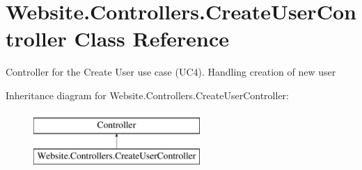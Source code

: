 \hypertarget{class_website_1_1_controllers_1_1_create_user_controller}{}\section{Website.\+Controllers.\+Create\+User\+Controller Class Reference}
\label{class_website_1_1_controllers_1_1_create_user_controller}


Controller for the Create User use case (U\+C4). Handling creation of new user  


Inheritance diagram for Website.\+Controllers.\+Create\+User\+Controller\+:\begin{figure}[H]
\begin{center}
\leavevmode
\includegraphics[height=2.000000cm]{class_website_1_1_controllers_1_1_create_user_controller}
\end{center}
\end{figure}
